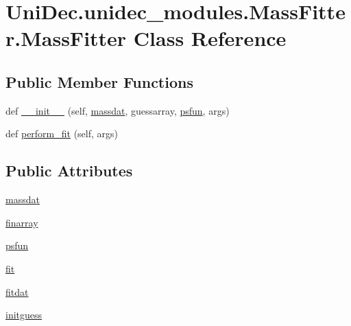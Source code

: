 \hypertarget{class_uni_dec_1_1unidec__modules_1_1_mass_fitter_1_1_mass_fitter}{}\section{Uni\+Dec.\+unidec\+\_\+modules.\+Mass\+Fitter.\+Mass\+Fitter Class Reference}
\label{class_uni_dec_1_1unidec__modules_1_1_mass_fitter_1_1_mass_fitter}
\subsection*{Public Member Functions}
\begin{DoxyCompactItemize}
\item 
def \hyperlink{class_uni_dec_1_1unidec__modules_1_1_mass_fitter_1_1_mass_fitter_a25900c7518d2bb9d028855ac926efc66}{\+\_\+\+\_\+init\+\_\+\+\_\+} (self, \hyperlink{class_uni_dec_1_1unidec__modules_1_1_mass_fitter_1_1_mass_fitter_ab746838fc37f1410454ff30ef13af877}{massdat}, guessarray, \hyperlink{class_uni_dec_1_1unidec__modules_1_1_mass_fitter_1_1_mass_fitter_ad57b1b5e2d1d395762b08ec71887bb14}{psfun}, args)
\item 
def \hyperlink{class_uni_dec_1_1unidec__modules_1_1_mass_fitter_1_1_mass_fitter_a28bb5518c5b2a6bf6765baead0e78b41}{perform\+\_\+fit} (self, args)
\end{DoxyCompactItemize}
\subsection*{Public Attributes}
\begin{DoxyCompactItemize}
\item 
\hyperlink{class_uni_dec_1_1unidec__modules_1_1_mass_fitter_1_1_mass_fitter_ab746838fc37f1410454ff30ef13af877}{massdat}
\item 
\hyperlink{class_uni_dec_1_1unidec__modules_1_1_mass_fitter_1_1_mass_fitter_abdb7104832b5aa6721fd4ec3569bc3df}{finarray}
\item 
\hyperlink{class_uni_dec_1_1unidec__modules_1_1_mass_fitter_1_1_mass_fitter_ad57b1b5e2d1d395762b08ec71887bb14}{psfun}
\item 
\hyperlink{class_uni_dec_1_1unidec__modules_1_1_mass_fitter_1_1_mass_fitter_a3d89617bda436392b85fcfb041fd4fc7}{fit}
\item 
\hyperlink{class_uni_dec_1_1unidec__modules_1_1_mass_fitter_1_1_mass_fitter_aa46bc370fb270615b3d4c20bf758b6ea}{fitdat}
\item 
\hyperlink{class_uni_dec_1_1unidec__modules_1_1_mass_fitter_1_1_mass_fitter_aa5570edcf6d1e58ee895c795885e45ab}{initguess}
\end{DoxyCompactItemize}


